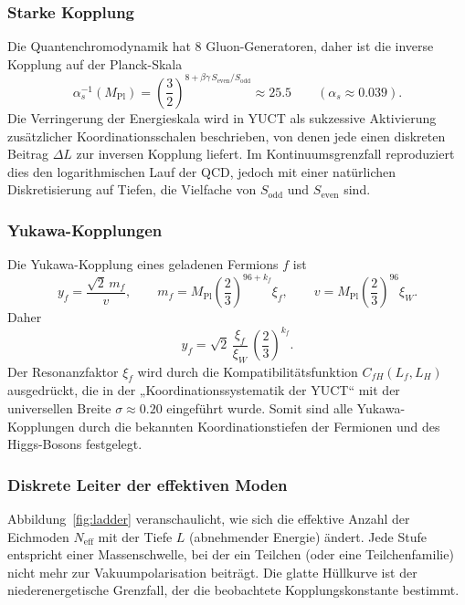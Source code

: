\documentclass[12pt,a4paper]{article}
\begin{document}
	\subsubsection{Starke Kopplung}
	Die Quantenchromodynamik hat 8 Gluon-Generatoren, daher ist die inverse Kopplung auf der Planck-Skala
	\begin{equation}
		\alpha_s^{-1}(M_{\mathrm{Pl}}) = \left(\frac{3}{2}\right)^{\!8 + \beta\gamma\,S_{\mathrm{even}}/S_{\mathrm{odd}}}
		\approx 25.5 \qquad (\alpha_s \approx 0.039) .
	\end{equation}
	Die Verringerung der Energieskala wird in YUCT als sukzessive Aktivierung zusätzlicher Koordinationsschalen beschrieben, von denen jede einen diskreten Beitrag \(\Delta L\) zur inversen Kopplung liefert. Im Kontinuumsgrenzfall reproduziert dies den logarithmischen Lauf der QCD, jedoch mit einer natürlichen Diskretisierung auf Tiefen, die Vielfache von \(S_{\mathrm{odd}}\) und \(S_{\mathrm{even}}\) sind.
	
	\subsubsection{Yukawa-Kopplungen}
	Die Yukawa-Kopplung eines geladenen Fermions \(f\) ist
	\begin{equation}
		y_f = \frac{\sqrt{2}\,m_f}{v},
		\qquad
		m_f = M_{\mathrm{Pl}}\left(\frac{2}{3}\right)^{\!96+k_f}\xi_f,
		\qquad
		v   = M_{\mathrm{Pl}}\left(\frac{2}{3}\right)^{\!96}\xi_W .
	\end{equation}
	Daher
	\begin{equation}
		y_f = \sqrt{2}\,\frac{\xi_f}{\xi_W}\,\left(\frac{2}{3}\right)^{\!k_f} .
	\end{equation}
	Der Resonanzfaktor \(\xi_f\) wird durch die Kompatibilitätsfunktion \(C_{fH}(L_f,L_H)\) ausgedrückt, die in der „Koordinationssystematik der YUCT“ mit der universellen Breite \(\sigma \approx 0.20\) eingeführt wurde. Somit sind alle Yukawa-Kopplungen durch die bekannten Koordinationstiefen der Fermionen und des Higgs-Bosons festgelegt.
	
	\subsubsection{Diskrete Leiter der effektiven Moden}
	Abbildung~\ref{fig:ladder} veranschaulicht, wie sich die effektive Anzahl der Eichmoden \(N_{\mathrm{eff}}\) mit der Tiefe \(L\) (abnehmender Energie) ändert. Jede Stufe entspricht einer Massenschwelle, bei der ein Teilchen (oder eine Teilchenfamilie) nicht mehr zur Vakuumpolarisation beiträgt. Die glatte Hüllkurve ist der niederenergetische Grenzfall, der die beobachtete Kopplungskonstante bestimmt.
	
\end{document}
